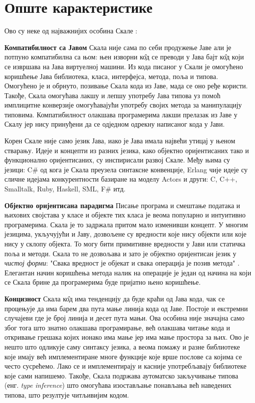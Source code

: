 \documentclass[12pt,oneside]{memoir}
\begin{document}
\section{Опште карактеристике}

Ово су неке од најважнијих особина Скале \cite{progInScala}:

\begin{description}
\item \textbf{Компатибилност са Јавом} Скала није сама по себи продужење Јаве али је потпуно компатибилна са њом: њен изворни к\^{о}д се преводи у Јава бајт к\^{о}д који се извршава на Јава виртуелној машини. Из кода писаног у Скали је омогућено коришћење Јава библиотека, класа, интерфејса, метода, поља и типова. Омогућено је и обрнуто, позивање Скала кода из Јаве, мада се оно ређе користи. Такође, Скала омогућава лакшу и лепшу употребу Јава типова уз помоћ имплицитне конверзије омогућавајући употребу својих метода за манипулацију типовима. Компатибилност олакшава програмерима лакши прелазак из Јаве у Скалу јер нису принуђени да се одједном одрекну написаног кода у Јави.

Корен Скале није само језик Јава, иако је Јава имала највећи утицај у њеном стварању. Идеје и концепти из разних језика, како објектно оријентисаних тако и функционално оријентисаних, су инспирисали развој Скале. Међу њима су језици: C\#  од кога је Скала преузела синтаксне конвенције, Erlang чије идеје су сличне идејама конкурентности базиране на моделу Actors и други: C, C++,  Smalltalk, Ruby, Haskell, SML, F\# итд.

\item \textbf{Објектно оријентисана парадигма} Писање програма и смештање података и њихових својстава у класе и објекте тих класа је веома популарно и интуитивно програмерима. Скала је то задржала притом мало изменивши концепт. У многим језицима, укључујући и Јаву, дозвољене су вредности  које нису објекти или које нису у склопу објекта. То могу бити примитивне вредности у Јави или статичка поља и методи. Скала то не дозвољава и зато је објектно оријентисан језик у \textit{чистој форми}: "Свака вредност је објекат и свака операција је позив метода" \cite{progInScala}. Елегантан начин коришћења метода налик на операције је један од начина на који се Скала брине да програмерима буде пријатно њено коришћење.

\item \textbf{Концизност} Скала к\^{о}д има тенденцију да буде краћи од Јава кода, чак се процењује да има барем два пута мање линија кода од Јаве. Постоје и екстремни случајеви где је број линија и десет пута мањи. Ова особина није значајна само због тога што знатно олакшава програмирање, већ олакшава читање кода и откривање грешака којих ионако има мање јер има мање простора за њих. Ово је нешто што одликује саму синтаксу језика, а веома помажу и разне библиотеке које имају већ имплементиране многе функције које врше послове са којима се често сусрећемо. Лако се и имплементирају и касније употребљавају библиотеке које сами напишемо. Такође, Скала подржава аутоматско закључивање типова (енг. \textit{type inference}) што омогућава изостављање понављања већ наведених типова, што резултује читљивијим кодом.


\end{description}
\end{document}
